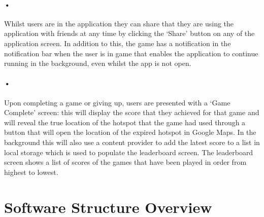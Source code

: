 \documentclass[10pt, a4paper]{article}
\begin{document}
\paragraph*{•}
Whilst users are in the application they can share that they are using the application with friends at any time by clicking the `Share' button on any of the application screen. In addition to this, the game has a  notification in the notification bar when the user is in game that enables the application to continue running in the background, even whilst the app is not open.

\paragraph*{•}
Upon completing a game or giving up, users are presented with a `Game Complete' screen: this will display the score that they achieved for that game and will reveal the true location of the hotspot that the game had used through a button that will open the location of the expired hotspot in Google Maps. In the background this will also use a content provider to add the latest score to a list in local storage which is used to populate the leaderboard screen. The leaderboard screen shows a list of scores of the games that have been played in order from highest to lowest.

\section*{Software Structure Overview}
\end{document}
